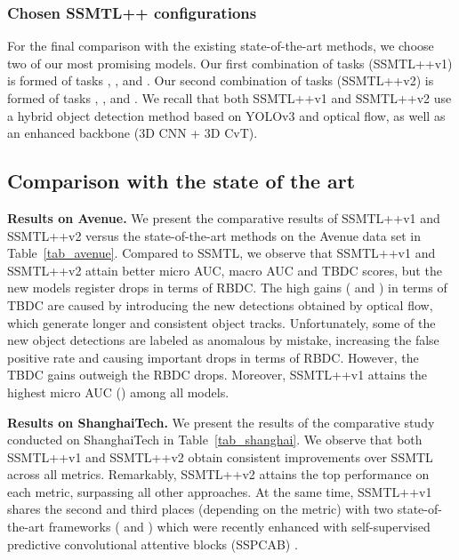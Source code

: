 \documentclass[times,twocolumn,final,authoryear]{elsarticle}
\begin{document}
\subsubsection{Chosen SSMTL++ configurations}

For the final comparison with the existing state-of-the-art methods, we choose two of our most promising models. Our first combination of tasks (SSMTL++v1) is formed of tasks , ,  and . Our second combination of tasks (SSMTL++v2) is formed of tasks , ,  and . We recall that both SSMTL++v1 and SSMTL++v2 use a hybrid object detection method based on YOLOv3 and optical flow, as well as an enhanced backbone (3D CNN + 3D CvT).

\subsection{Comparison with the state of the art}


\noindent
{\bf Results on Avenue.}
We present the comparative results of SSMTL++v1 and SSMTL++v2 versus the state-of-the-art methods on the Avenue data set in Table~\ref{tab_avenue}. Compared to SSMTL, we observe that SSMTL++v1 and SSMTL++v2 attain better micro AUC, macro AUC and TBDC scores, but the new models register drops in terms of RBDC. The high gains ( and ) in terms of TBDC are caused by introducing the new detections obtained by optical flow, which generate longer and consistent object tracks. Unfortunately, some of the new object detections are labeled as anomalous by mistake, increasing the false positive rate and causing important drops in terms of RBDC. However, the TBDC gains outweigh the RBDC drops. Moreover, SSMTL++v1 attains the highest micro AUC () among all models.

\noindent
{\bf Results on ShanghaiTech.}
We present the results of the comparative study conducted on ShanghaiTech in Table~\ref{tab_shanghai}. We observe that both SSMTL++v1 and SSMTL++v2 obtain consistent improvements over SSMTL \citep{Georgescu-CVPR-2021} across all metrics. Remarkably, SSMTL++v2 attains the top performance on each metric, surpassing all other approaches. At the same time, SSMTL++v1 shares the second and third places (depending on the metric) with two state-of-the-art frameworks (\cite{Georgescu-TPAMI-2021} and \cite{Liu-CVPR-2018}) which were recently enhanced with self-supervised predictive convolutional attentive blocks (SSPCAB) \citep{Ristea-CVPR-2022}.
\end{document}
